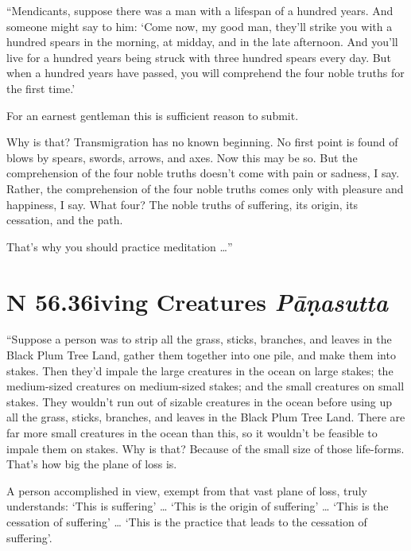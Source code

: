 \documentclass[12pt,openany]{book}%
\newcommand*{\suttatitleacronym}[1]{\smaller[2]{#1}\vspace*{.3em}}
\newcommand*{\suttatitletranslation}[1]{\linebreak{#1}}
\newcommand*{\suttatitleroot}[1]{\linebreak\smaller[2]\itshape{#1}}
\newcommand*{\tocacronym}[1]{\hspace*{-3.3em}{#1}\quad}
\newcommand*{\toctranslation}[1]{#1}
\newcommand*{\tocroot}[1]{(\textit{#1})}
\begin{document}
“Mendicants, suppose there was a man with a lifespan of a hundred years. And someone might say to him: ‘Come now, my good man, they’ll strike you with a hundred spears in the morning, at midday, and in the late afternoon. And you’ll live for a hundred years being struck with three hundred spears every day. But when a hundred years have passed, you will comprehend the four noble truths for the first time.’ 

For an earnest gentleman this is sufficient reason to submit. 

Why is that? Transmigration has no known beginning. No first point is found of blows by spears, swords, arrows, and axes. Now this may be so. But the comprehension of the four noble truths doesn’t come with pain or sadness, I say. Rather, the comprehension of the four noble truths comes only with pleasure and happiness, I say. What four? The noble truths of suffering, its origin, its cessation, and the path. 

That’s why you should practice meditation …” 

%
\section*{{\suttatitleacronym SN 56.36}{\suttatitletranslation Living Creatures }{\suttatitleroot Pāṇasutta}}
\addcontentsline{toc}{section}{\tocacronym{SN 56.36} \toctranslation{Living Creatures } \tocroot{Pāṇasutta}}

“Suppose a person was to strip all the grass, sticks, branches, and leaves in the Black Plum Tree Land, gather them together into one pile, and make them into stakes. Then they’d impale the large creatures in the ocean on large stakes; the medium-sized creatures on medium-sized stakes; and the small creatures on small stakes. They wouldn’t run out of sizable creatures in the ocean before using up all the grass, sticks, branches, and leaves in the Black Plum Tree Land. There are far more small creatures in the ocean than this, so it wouldn’t be feasible to impale them on stakes. Why is that? Because of the small size of those life-forms. That’s how big the plane of loss is. 

A person accomplished in view, exempt from that vast plane of loss, truly understands: ‘This is suffering’ … ‘This is the origin of suffering’ … ‘This is the cessation of suffering’ … ‘This is the practice that leads to the cessation of suffering’. 
\end{document}
